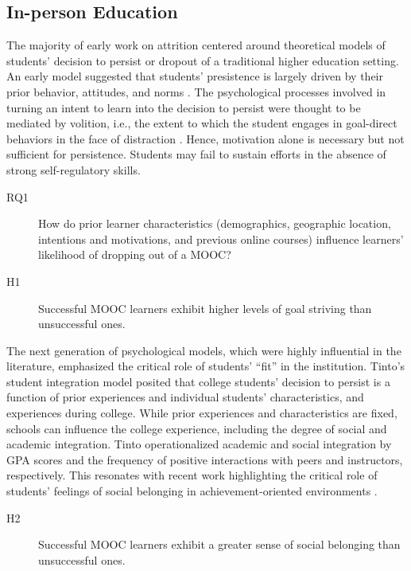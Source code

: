 \documentclass{sigchi}\usepackage[]{graphicx}\usepackage[]{color}
\begin{document}
\subsection{In-person Education}

The majority of early work on attrition centered around theoretical models of students' decision to persist or dropout of a traditional higher education setting. An early model suggested that students' presistence is largely driven by their prior behavior, attitudes, and norms \cite{fishbein1975belief}. The psychological processes involved in turning an intent to learn into the decision to persist were thought to be mediated by volition, i.e., the extent to which the student engages in goal-direct behaviors in the face of distraction \cite{corno1993role}. Hence, motivation alone is necessary but not sufficient for persistence. Students may fail to sustain efforts in the absence of strong self-regulatory skills.

\begin{description}
  \item[RQ1] How do prior learner characteristics (demographics, geographic location, intentions and motivations, and previous online courses) influence learners' likelihood of dropping out of a MOOC?
  \item[H1] Successful MOOC learners exhibit higher levels of goal striving than unsuccessful ones.
\end{description}

The next generation of psychological models, which were highly influential in the literature, emphasized the critical role of students' ``fit'' in the institution. Tinto's \citeyear{tinto1975dropout} student integration model posited that college students' decision to persist is a function of prior experiences and individual students' characteristics, and experiences during college. While prior experiences and characteristics are fixed, schools can influence the college experience, including the degree of social and academic integration. Tinto operationalized academic and social integration by GPA scores and the frequency of positive interactions with peers and instructors, respectively. This resonates with recent work highlighting the critical role of students' feelings of social belonging in achievement-oriented environments \cite{walton2007question}. 

\begin{description}
  \item[H2] Successful MOOC learners exhibit a greater sense of social belonging than unsuccessful ones.
\end{description}
\end{document}
